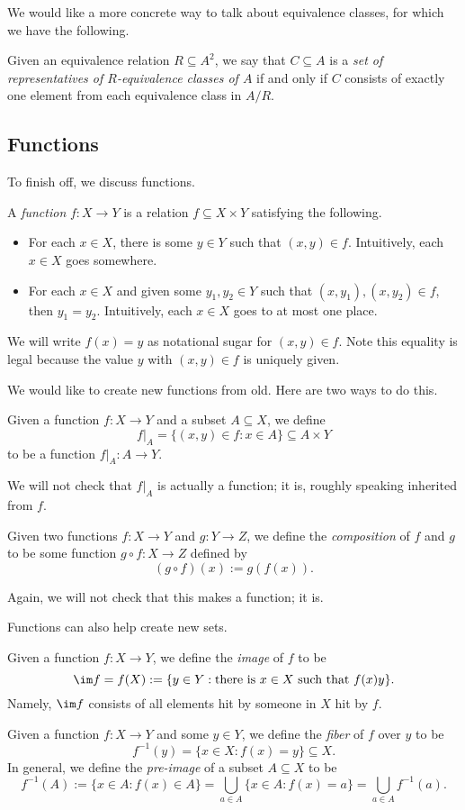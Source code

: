 We would like a more concrete way to talk about equivalence classes, for which we have the following.
\begin{definition}[Representatives]
	Given an equivalence relation $R\subseteq A^2$, we say that $C\subseteq A$ is a \textit{set of representatives of $R$-equivalence classes of $A$} if and only if $C$ consists of exactly one element from each equivalence class in $A/R$.
\end{definition}

\subsection{Functions}
To finish off, we discuss functions.
\begin{definition}[Functions]
	A \textit{function} $f:X\to Y$ is a relation $f\subseteq X\times Y$ satisfying the following.
	\begin{itemize}
		\item For each $x\in X$, there is some $y\in Y$ such that $(x,y)\in f$. Intuitively, each $x\in X$ goes somewhere.
		\item For each $x\in X$ and given some $y_1,y_2\in Y$ such that $(x,y_1),(x,y_2)\in f$, then $y_1=y_2$. Intuitively, each $x\in X$ goes to at most one place.
	\end{itemize}
	We will write $f(x)=y$ as notational sugar for $(x,y)\in f$. Note this equality is legal because the value $y$ with $(x,y)\in f$ is uniquely given.
\end{definition}
We would like to create new functions from old. Here are two ways to do this.
\begin{definition}[Restriction]
	Given a function $f:X\to Y$ and a subset $A\subseteq X$, we define
	\[f|_A=\{(x,y)\in f:x\in A\}\subseteq A\times Y\]
	to be a function $f|_A:A\to Y$.
\end{definition}
We will not check that $f|_A$ is actually a function; it is, roughly speaking inherited from $f$.
\begin{definition}
	Given two functions $f:X\to Y$ and $g:Y\to Z$, we define the \textit{composition} of $f$ and $g$ to be some function $g\circ f:X\to Z$ defined by
	\[(g\circ f)(x):=g(f(x)).\]
\end{definition}
Again, we will not check that this makes a function; it is.

Functions can also help create new sets.
\begin{definition}[Image]
	Given a function $f:X\to Y$, we define the \textit{image} of $f$ to be
	\[\im f=f(X):=\{y\in Y:\text{there is }x\in X\text{ such that }f(x)y\}.\]
	Namely, $\im f$ consists of all elements hit by someone in $X$ hit by $f$.
\end{definition}
\begin{definition}
	Given a function $f:X\to Y$ and some $y\in Y$, we define the \textit{fiber} of $f$ over $y$ to be
	\[f^{-1}(y)=\{x\in X:f(x)=y\}\subseteq X.\]
	In general, we define the \textit{pre-image} of a subset $A\subseteq X$ to be
	\[f^{-1}(A):=\{x\in A:f(x)\in A\}=\bigcup_{a\in A}\{x\in A:f(x)=a\}=\bigcup_{a\in A}f^{-1}(a).\]
\end{definition}

